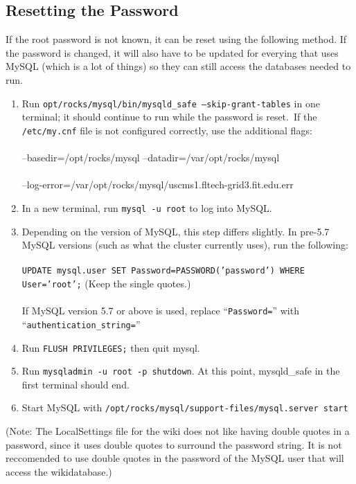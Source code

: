 \documentclass[12pt]{article}
\begin{document}
\subsection{Resetting the Password}
If the root password is not known, it can be reset using the following method. If the password is changed, it will also have to be updated for everying that uses MySQL (which is a lot of things) so they can still access the databases needed to run.
\begin{enumerate}
\item Run {\tt opt/rocks/mysql/bin/mysqld\_safe --skip-grant-tables} in one terminal; it should continue to run while the password is reset.\
  If the {\tt/etc/my.cnf} file is not configured correctly, use the additional flags:
  \paragraph{}--basedir=/opt/rocks/mysql  --datadir=/var/opt/rocks/mysql
  \paragraph{}--log-error=/var/opt/rocks/mysql/uscms1.fltech-grid3.fit.edu.err
\item In a new terminal, run {\tt mysql -u root} to log into MySQL. 
\item Depending on the version of MySQL, this step differs slightly. In pre-5.7 MySQL versions (such as what the cluster currently uses), run the following:
 \paragraph{} {\tt UPDATE mysql.user SET Password=PASSWORD('password') WHERE User='root';}    (Keep the single quotes.)\
  \paragraph{}If MySQL version 5.7 or above is used, replace ``{\tt Password=}'' with ``{\tt authentication\_string=}''
\item Run {\tt FLUSH PRIVILEGES;} then quit mysql.
\item Run {\tt mysqladmin -u root -p shutdown}. At this point, mysqld\_safe in the first terminal should end.
\item Start MySQL with {\tt /opt/rocks/mysql/support-files/mysql.server start}
\end{enumerate}

(Note: The LocalSettings file for the wiki does not like having double quotes in a password, since it uses double quotes to surround the password string. It is not reccomended to use double quotes in the password of the MySQL user that will access the wikidatabase.) 
\end{document}
